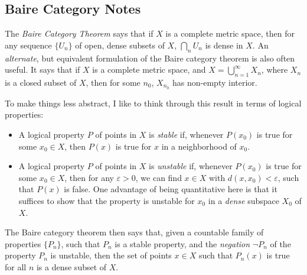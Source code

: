 \documentclass[answers]{exam}
\begin{document}
\begin{questions}
\newpage
\section{Baire Category Notes}

The \emph{Baire Category Theorem} says that if $X$ is a complete metric space, then for any sequence $\{ U_n \}$ of open, dense subsets of $X$, $\bigcap_n U_n$ is dense in $X$. An \emph{alternate}, but equivalent formulation of the Baire category theorem is also often useful. It says that if $X$ is a complete metric space, and $X = \bigcup_{n = 1}^\infty X_n$, where $X_n$ is a closed subset of $X$, then for some $n_0$, $X_{n_0}$ has non-empty interior.	

To make things less abstract, I like to think through this result in terms of logical properties:
%
\begin{itemize}
	\item A logical property $P$ of points in $X$ is \emph{stable} if, whenever $P(x_0)$ is true for some $x_0 \in X$, then $P(x)$ is true for $x$ in a neighborhood of $x_0$.

	\item A logical property $P$ of points in $X$ is \emph{unstable} if, whenever $P(x_0)$ is true for some $x_0 \in X$, then for any $\varepsilon > 0$, we can find $x \in X$ with $d(x,x_0) < \varepsilon$, such that $P(x)$ is false. One advantage of being quantitative here is that it suffices to show that the property is unstable for $x_0$ in a \emph{dense} subspace $X_0$ of $X$.
\end{itemize}
%
The Baire category theorem then says that, given a countable family of properties $\{ P_n \}$, such that $P_n$ is a stable property, and the \emph{negation} $\neg P_n$ of the property $P_n$ is unstable, then the set of points $x \in X$ such that $P_n(x)$ is true for all $n$ is a dense subset of $X$.


\end{questions}
\end{document}

